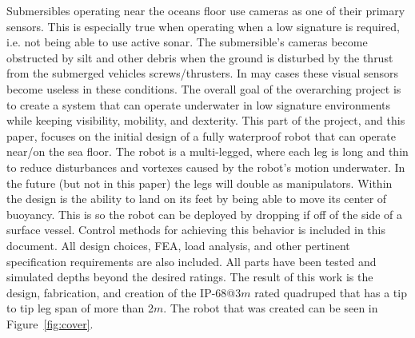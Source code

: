 Submersibles operating near the oceans floor use cameras as one of their primary sensors.
This is especially true when operating when a low signature is required, i.e. not being able to use active sonar.
The submersible's cameras become obstructed by silt and other debris when the ground is disturbed by the thrust from the submerged vehicles screws/thrusters.
In may cases these visual sensors become useless in these conditions.
The overall goal of the overarching project is to create a system that can operate underwater in low signature environments while keeping visibility, mobility, and dexterity. 
This part of the project, and this paper, focuses on the initial design of a fully waterproof robot that can operate near/on the sea floor.
The robot is a multi-legged, where each leg is long and thin to reduce disturbances and vortexes caused by the robot's motion underwater.
In the future (but not in this paper) the legs will double as manipulators.
Within the design is the ability to land on its feet by being able to move its center of buoyancy.
This is so the robot can be deployed by dropping if off of the side of a surface vessel.
Control methods for achieving this behavior is included in this document.
All design choices, FEA, load analysis, and other pertinent specification requirements are also included.
All parts have been tested and simulated depths beyond the desired ratings.
The result of this work is the design, fabrication, and creation of the IP-68@3$m$ rated quadruped that has a tip to tip leg span of more than 2$m$.
The robot that was created can be seen in Figure~\ref{fig:cover}.




